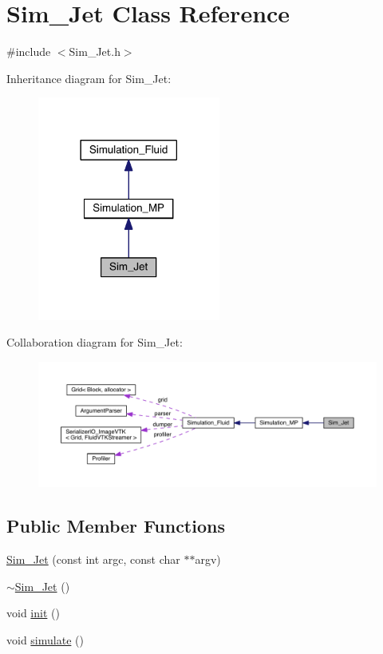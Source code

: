 \hypertarget{class_sim___jet}{}\section{Sim\+\_\+\+Jet Class Reference}
\label{class_sim___jet}


{\ttfamily \#include $<$Sim\+\_\+\+Jet.\+h$>$}



Inheritance diagram for Sim\+\_\+\+Jet\+:\nopagebreak
\begin{figure}[H]
\begin{center}
\leavevmode
\includegraphics[width=170pt]{dc/ded/class_sim___jet__inherit__graph}
\end{center}
\end{figure}


Collaboration diagram for Sim\+\_\+\+Jet\+:\nopagebreak
\begin{figure}[H]
\begin{center}
\leavevmode
\includegraphics[width=350pt]{d7/d68/class_sim___jet__coll__graph}
\end{center}
\end{figure}
\subsection*{Public Member Functions}
\begin{DoxyCompactItemize}
\item 
\hyperlink{class_sim___jet_a55cc5b1a66fd39413e252327a6ee4091}{Sim\+\_\+\+Jet} (const int argc, const char $\ast$$\ast$argv)
\item 
\hyperlink{class_sim___jet_afc9beed5792589b50c1409b06dc8e112}{$\sim$\+Sim\+\_\+\+Jet} ()
\item 
void \hyperlink{class_sim___jet_aec86e6b61d327624b44b4b6e9136845f}{init} ()
\item 
void \hyperlink{class_sim___jet_a73a75e39a166c0e4cd61c8135d63ac86}{simulate} ()
\end{DoxyCompactItemize}
